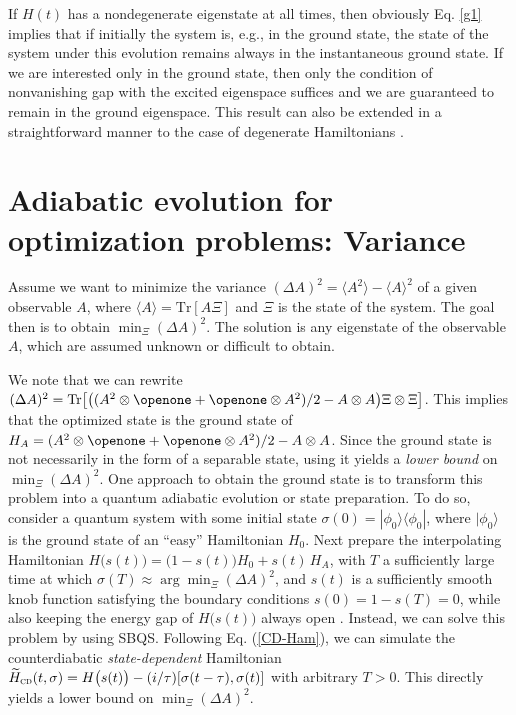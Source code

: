 \documentclass[aps,pra,twocolumn,floatfix,groupedaddress,superscriptaddress,nofootinbib,notitlepage]{revtex4-2}
\begin{document}
If $H(t)$ has a nondegenerate eigenstate at all times, then obviously Eq. \eqref{g1} implies that if initially the system is, e.g., in the ground state, the state of the system under this evolution remains always in the instantaneous ground state. If we are interested only in the ground state, then only the condition of nonvanishing gap with the excited eigenspace suffices and we are guaranteed to remain in the ground eigenspace. This result can also be extended in a straightforward manner to the case of degenerate Hamiltonians \cite{Refael-etal}. 

\section{Adiabatic evolution for optimization problems: Variance}
\label{app:variance}

Assume we want to minimize the variance $(\Delta A)^{2} = \langle A^{2}\rangle - \langle A \rangle^{2}$ of a given observable $A$, where $\langle A\rangle = \mathrm{Tr}[A\Xi]$ and $\Xi$ is the state of the system. The goal then is to obtain $\min_{\Xi}(\Delta A)^{2}$. The solution is any eigenstate of the observable $A$, which are assumed unknown or difficult to obtain.

We note that we can rewrite $(\Delta A)^{2} = \mathrm{Tr}\big[\big((A^{2}\otimes \openone + \openone \otimes  A^{2})/2 - A \otimes A\big) \Xi \otimes \Xi \big]$. This implies that the optimized state is the ground state of $H_{A}=(A^{2} \otimes \openone + \openone \otimes A^{2})/2 - A \otimes A$. Since the ground state is not necessarily in the form of a separable state, using it yields a \textit{lower bound} on $\min_{\Xi}(\Delta A)^{2}$. One approach to obtain the ground state is to transform this problem into a quantum adiabatic evolution or state preparation. To do so, consider a quantum system with some initial state $\sigma(0) = |\phi_{0}\rangle \langle \phi_{0}|$, where $|\phi_{0}\rangle$ is the ground state of an ``easy'' Hamiltonian $H_{0}$. Next prepare the interpolating Hamiltonian $H\big(s(t)\big) = \big(1-s(t)\big) H_{0}+s(t)\, H_{A}$, with $T$ a sufficiently large time at which $\sigma(T)\approx \arg\min_{\Xi}(\Delta A)^{2}$, and $s(t)$ is a sufficiently smooth knob function satisfying the boundary conditions $s(0)=1-s(T)=0$, while also keeping the energy gap of $H\big(s(t)\big)$ always open \cite{exp-ad}. Instead, we can solve this problem by using SBQS. Following Eq. (\ref{CD-Ham}), we can simulate the counterdiabatic \textit{state-dependent} Hamiltonian $\widetilde{H}_{\textsc{cd}}(t,\sigma) = H\big(s(t)\big) - (i/\tau)[\sigma(t-\tau), \sigma(t)]$ with arbitrary $T>0$. This directly yields a lower bound on $\min_{\Xi}(\Delta A)^{2}$.
\end{document}
